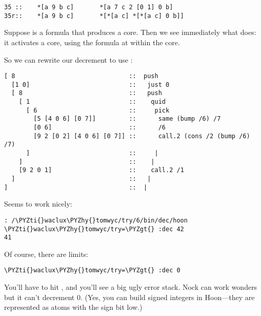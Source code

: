 \begin{framed_shaded}
\begin{Verbatim}[fontsize=\relsize{-2.5},fontseries=b,commandchars=\\\{\}]
35 ::    *[a 9 b c]       *[a 7 c 2 [0 1] 0 b]
35r::    *[a 9 b c]       *[*[a c] *[*[a c] 0 b]]
\end{Verbatim}
\end{framed_shaded}
Suppose  is a formula that produces a core.  Then we see
immediately what  does: it activates a core, using the formula
at  within the core.

So we can rewrite our decrement to use :

\begin{framed_shaded}
\begin{Verbatim}[fontsize=\relsize{-2.5},fontseries=b,commandchars=\\\{\}]
[ 8                               ::  push
  [1 0]                           ::   just 0
  [ 8                             ::   push
    [ 1                           ::    quid
      [ 6                         ::     pick
        [5 [4 0 6] [0 7]]         ::      same (bump /6) /7
        [0 6]                     ::      /6
        [9 2 [0 2] [4 0 6] [0 7]] ::      call.2 (cons /2 (bump /6) /7)
      ]                           ::     |
    ]                             ::    |
    [9 2 0 1]                     ::    call.2 /1
  ]                               ::   |
]                                 ::  |
\end{Verbatim}
\end{framed_shaded}
Seems to work nicely:

\begin{framed_shaded}
\begin{Verbatim}[fontsize=\relsize{-2.5},fontseries=b,commandchars=\\\{\}]
: /\PYZti{}waclux\PYZhy{}tomwyc/try/6/bin/dec/hoon
\PYZti{}waclux\PYZhy{}tomwyc/try=\PYZgt{} :dec 42
41
\end{Verbatim}
\end{framed_shaded}
Of course, there are limits:

\begin{framed_shaded}
\begin{Verbatim}[fontsize=\relsize{-2.5},fontseries=b,commandchars=\\\{\}]
\PYZti{}waclux\PYZhy{}tomwyc/try=\PYZgt{} :dec 0
\end{Verbatim}
\end{framed_shaded}
You'll have to hit , and you'll see a big ugly error stack.
Nock can work wonders but it can't decrement 0.  (Yes, you can
build signed integers in Hoon---they are represented as atoms
with the sign bit low.)

